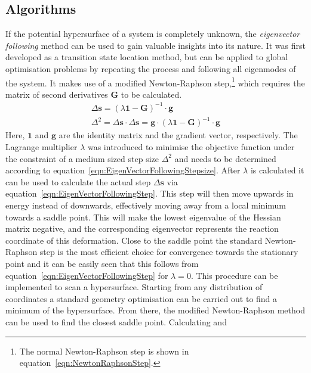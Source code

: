\subsection{Algorithms}
\label{sec:GOAlgorithms}

If the potential hypersurface of a system is completely unknown, the
\textit{eigenvector following} method can be used to gain valuable insights into
its nature. It was first developed as a transition state location
method\autocite{Cerjan_findingtransitionstates_1981}, but can be applied to
global optimisation problems by repeating the process and following all
eigenmodes of the system. It makes use of a modified Newton-Raphson
step,\footnote{The normal Newton-Raphson step is shown in
equation~\eqref{eqn:NewtonRaphsonStep}.} which requires the matrix of second
derivatives $\mathbf{G}$ to be calculated.
%
\begin{align}
    \Delta \mathbf{s}=\left(\lambda\mathbf{1}-\mathbf{G}\right)^{-1}\cdot\mathbf{g}\label{eqn:EigenVectorFollowingStep}\\
    \Delta^2=\Delta \mathbf{s}\cdot\Delta \mathbf{s}=\mathbf{g}\cdot\left(\lambda\mathbf{1}-\mathbf{G}\right)^{-1}\cdot\mathbf{g}\label{eqn:EigenVectorFollowingStepsize}
\end{align}
%
Here, $\mathbf{1}$ and $\mathbf{g}$ are the identity matrix and the gradient
vector, respectively. The Lagrange multiplier $\lambda$ was introduced to
minimise the objective function under the constraint of a medium sized step size
$\Delta^2$ and needs to be determined according to
equation~\eqref{eqn:EigenVectorFollowingStepsize}. After $\lambda$ is calculated
it can be used to calculate the actual step $\Delta\mathbf{s}$ via
equation~\eqref{eqn:EigenVectorFollowingStep}. This step will then move upwards
in energy instead of downwards, effectively moving away from a local minimum
towards a saddle point. This will make the lowest eigenvalue of the Hessian
matrix negative, and the corresponding eigenvector represents the reaction
coordinate of this deformation. Close to the saddle point the standard
Newton-Raphson step is the most efficient choice for convergence towards the
stationary point and it can be easily seen that this follows from
equation~\eqref{eqn:EigenVectorFollowingStep} for $\lambda=0$. This procedure
can be implemented to scan a
hypersurface.\autocite{Wales_EnergyLandscapesClusters_2000} Starting from any
distribution of coordinates a standard geometry optimisation can be carried out
to find a minimum of the hypersurface. From there, the modified Newton-Raphson
method can be used to find the closest saddle point. Calculating and

